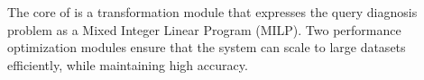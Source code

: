 The core of \sys is a transformation module that expresses the query diagnosis
problem as a Mixed Integer Linear Program (MILP). Two performance optimization modules
ensure that the system can scale to large datasets efficiently, while
maintaining high accuracy. 



